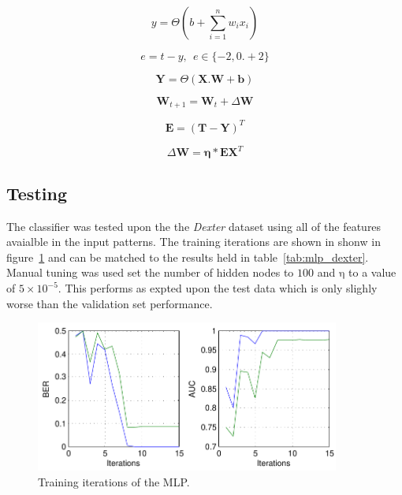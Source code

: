 \documentclass{ecsarticle}     %
\begin{document}
\begin{equation}
   y = \Theta \left(b + \sum_{i=1}^{n} w_i x_i \right)
   \label{eqn:slp}
\end{equation}

\begin{equation}	
	e = t - y,\:\:e \in \{-2,0.+2\}
	\label{eqn:slp_error}
\end{equation}

\begin{equation}
   \textbf{Y} = \Theta ( \textbf{X}.\textbf{W} + \textbf{b})
   \label{eqn:slp_mat}
\end{equation}

\begin{equation}	
	\textbf{W}_{t+1} = \textbf{W}_t + \Delta \textbf{W}
	\label{eqn:slp_learn_1}
\end{equation}

\begin{equation}	
	\mathbf{E} = (\mathbf{T} - \mathbf{Y})^{T}
	\label{eqn:slp_learn_2}
\end{equation}

\begin{equation}	
	\Delta \mathbf{W} = \mathbf{\eta}*\mathbf{E}\mathbf{X}^T
	\label{eqn:slp_learn_3}
\end{equation}


\subsection{Testing}



The classifier was tested upon the the \emph{Dexter} dataset using all of the features avaialble in the input patterns.
The training iterations are shown in shonw in figure~\ref{fig:mlp_train} and can be matched to the results held in table~\ref{tab:mlp_dexter}.
Manual tuning was used set the number of hidden nodes to $\mathrm{100}$ and $\mathrm{\eta}$ to a value of $\mathrm{5 \times 10^{-5}}$.
This performs as expted upon the test data which is only slighly worse than the validation set performance.

\begin{figure}[ht]
   \centering
    \includegraphics[width = 10cm]{MLP_Train.pdf}
   \caption{Training iterations of the MLP.}
   \label{fig:mlp_train}
\end{figure}
\end{document}
